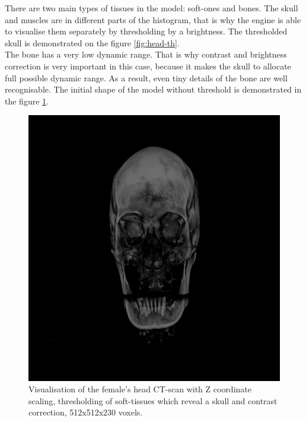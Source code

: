 \documentclass[twoside, english, 11pt]{report}
\begin{document}
There are two main types of tissues in the model: soft-ones and bones. The skull and muscles are in different parts of the histogram, that is why the engine is able to visualise them separately by thresholding by a brightness. The thresholded skull is demonstrated on the figure \ref{fig:head-th}.\\

The bone has a very low dynamic range. That is why contrast and brightness correction is very important in this case, because it makes the skull to allocate full possible dynamic range. As a result, even tiny details of the bone are well recognisable. The initial shape of the model without threshold is demonstrated in the figure \ref{fig:head-th-win}. \\

\begin{figure}[H]
\centerline{\includegraphics[scale = 0.45]{img/head-th-win}}
\caption{Visualisation of the female's head CT-scan with Z coordinate scaling, thresholding of soft-tissues which reveal a skull and contrast correction, 512x512x230 voxels.\label{fig:head-th-win}}
\end{figure}
\end{document}
